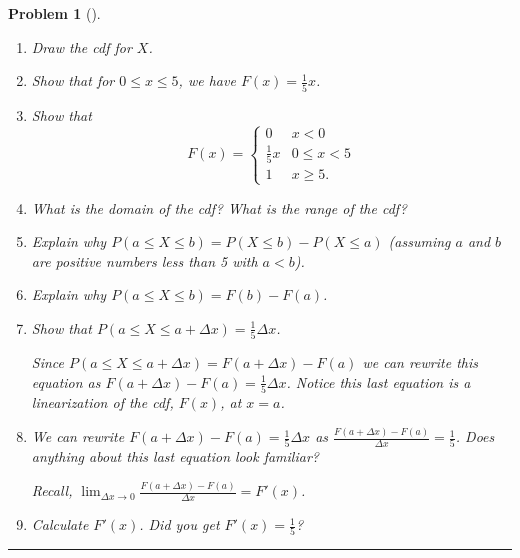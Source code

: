 \documentclass[letterpaper,oneside]{book}%
\theoremstyle{plain}
\theoremstyle{box}
\theoremstyle{problem}
\newtheorem{problemnum}{Problem}[chapter]
\newenvironment{problem}[1][]{\begin{problemnum}[#1]}{\end{problemnum}\nopagebreak\hrule\bigskip}
\begin{document}
\begin{problem}
\begin{enumerate}
\begin{enumerate}
   \end{enumerate}
  \item Draw the cdf for $X$.
  \item Show that for $0\leq x\leq 5$, we have $F(x) = \frac{1}{5}x$.
  \item Show that $$F(x) =\begin{cases}0 & x < 0 \\\frac{1}{5}x & 0 \leq x < 5 \\ 1 & x \geq 5.\end{cases}$$
  \item What is the domain of the cdf?  What is the range of the cdf? 
  \item Explain why $P(a\leq X\leq b) = P(X\leq b)-P(X\leq a)$ (assuming $a$ and $b$ are positive numbers less than 5 with $a<b$).
  \item Explain why $P(a \leq X \leq b) = F(b) - F(a)$.
  \item Show that $P(a \leq X \leq a +\Delta x) = \frac{1}{5} \Delta x$. 
  
  Since $P(a \leq X \leq a +\Delta x) = F(a + \Delta x) - F(a)$ we can rewrite this equation as $F(a + \Delta x) - F(a) = \frac{1}{5} \Delta x$. Notice this last equation is a linearization of the cdf, $F(x)$, at $x = a$.
  \item We can rewrite $F(a + \Delta x) - F(a) = \frac{1}{5} \Delta x$ as $\frac{F(a + \Delta x) - F(a)}{\Delta x} = \frac{1}{5}$. Does anything about this last equation look familiar?
  
  Recall, $\lim_{\Delta x \rightarrow 0}\frac{F(a + \Delta x) - F(a)}{\Delta x} = F'(x)$.
  \item Calculate $F'(x)$. Did you get $F'(x) = \frac{1}{5}$?
 \end{enumerate}
\end{problem}
\end{document}
